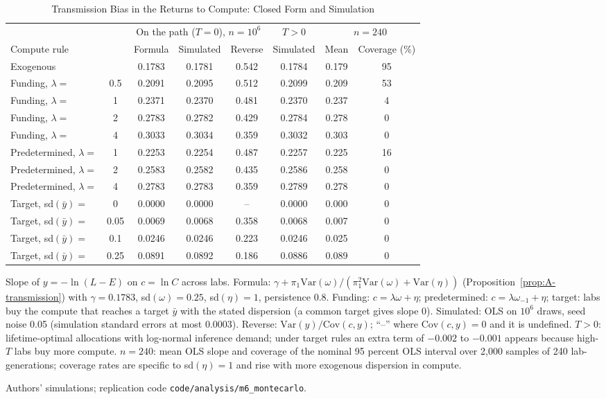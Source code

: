 \begin{table}[tp]
\centering
\caption{Transmission Bias in the Returns to Compute: Closed Form and Simulation}
\label{tab:app-mc-transmission}
\footnotesize
\setlength{\tabcolsep}{4pt}
\begin{tabular}{@{}lccccccc@{}}
\toprule
 & & \multicolumn{3}{c}{On the path ($T=0$), $n=10^6$} & $T>0$ & \multicolumn{2}{c}{$n=240$} \\
\cmidrule(lr){3-5}\cmidrule(lr){6-6}\cmidrule(l){7-8}
Compute rule & & Formula & Simulated & Reverse & Simulated & Mean & Coverage (\%) \\
\midrule
Exogenous &  & 0.1783 & 0.1781 & 0.542 & 0.1784 & 0.179 & 95 \\
Funding, $\lambda=$ & 0.5 & 0.2091 & 0.2095 & 0.512 & 0.2099 & 0.209 & 53 \\
Funding, $\lambda=$ & 1 & 0.2371 & 0.2370 & 0.481 & 0.2370 & 0.237 & 4 \\
Funding, $\lambda=$ & 2 & 0.2783 & 0.2782 & 0.429 & 0.2784 & 0.278 & 0 \\
Funding, $\lambda=$ & 4 & 0.3033 & 0.3034 & 0.359 & 0.3032 & 0.303 & 0 \\
Predetermined, $\lambda=$ & 1 & 0.2253 & 0.2254 & 0.487 & 0.2257 & 0.225 & 16 \\
Predetermined, $\lambda=$ & 2 & 0.2583 & 0.2582 & 0.435 & 0.2586 & 0.258 & 0 \\
Predetermined, $\lambda=$ & 4 & 0.2783 & 0.2783 & 0.359 & 0.2789 & 0.278 & 0 \\
Target, sd$(\bar y)=$ & 0 & 0.0000 & 0.0000 & -- & 0.0000 & 0.000 & 0 \\
Target, sd$(\bar y)=$ & 0.05 & 0.0069 & 0.0068 & 0.358 & 0.0068 & 0.007 & 0 \\
Target, sd$(\bar y)=$ & 0.1 & 0.0246 & 0.0246 & 0.223 & 0.0246 & 0.025 & 0 \\
Target, sd$(\bar y)=$ & 0.25 & 0.0891 & 0.0892 & 0.186 & 0.0886 & 0.089 & 0 \\
\bottomrule
\end{tabular}
\par\smallskip
\begin{tablenotes}Slope of $y=-\ln(L-E)$ on $c=\ln C$ across labs. Formula: $\gamma+\pi_1\mathrm{Var}(\omega)/(\pi_1^2\mathrm{Var}(\omega)+\mathrm{Var}(\eta))$ (Proposition~\ref{prop:A-transmission}) with $\gamma=0.1783$, sd$(\omega)=0.25$, sd$(\eta)=1$, persistence 0.8. Funding: $c=\lambda\omega+\eta$; predetermined: $c=\lambda\omega_{-1}+\eta$; target: labs buy the compute that reaches a target $\bar y$ with the stated dispersion (a common target gives slope 0). Simulated: OLS on $10^6$ draws, seed noise 0.05 (simulation standard errors at most 0.0003). Reverse: $\mathrm{Var}(y)/\mathrm{Cov}(c,y)$; ``--'' where $\mathrm{Cov}(c,y)=0$ and it is undefined. $T>0$: lifetime-optimal allocations with log-normal inference demand; under target rules an extra term of $-0.002$ to $-0.001$ appears because high-$T$ labs buy more compute. $n=240$: mean OLS slope and coverage of the nominal 95 percent OLS interval over 2,000 samples of 240 lab-generations; coverage rates are specific to sd$(\eta)=1$ and rise with more exogenous dispersion in compute.\end{tablenotes}
\begin{tablenotes}[Source]Authors' simulations; replication code \texttt{code/analysis/m6\_montecarlo}.\end{tablenotes}
\end{table}
